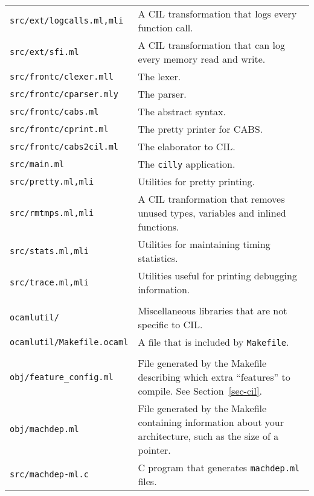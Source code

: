 \documentclass[letterpaper]{article}
\def\secref#1{Section~\ref{sec-#1}}
\def\t#1{{\tt #1}}
\begin{document}
\begin{longtable}{lp{4in}}
\t{src/ext/logcalls.ml,mli}     & A CIL transformation that logs every
                                   function call. \\
\t{src/ext/sfi.ml}              & A CIL transformation that can log every
                                   memory read and write. \\
\t{src/frontc/clexer.mll}       & The lexer. \\
\t{src/frontc/cparser.mly}      & The parser. \\
\t{src/frontc/cabs.ml}          & The abstract syntax. \\
\t{src/frontc/cprint.ml}        & The pretty printer for CABS. \\
\t{src/frontc/cabs2cil.ml}      & The elaborator to CIL. \\
\t{src/main.ml}                 & The \t{cilly} application. \\
\t{src/pretty.ml,mli}           & Utilities for pretty printing. \\
\t{src/rmtmps.ml,mli}           & A CIL tranformation that removes unused
                                  types, variables and inlined functions. \\
\t{src/stats.ml,mli}            & Utilities for maintaining timing statistics.
\\
\t{src/trace.ml,mli}            & Utilities useful for printing debugging
                                   information.\\
\\
\t{ocamlutil/}                  & Miscellaneous libraries that are not
                                  specific to CIL. \\
\t{ocamlutil/Makefile.ocaml}    & A file that is included by \t{Makefile}. \\
\\
\t{obj/feature\_config.ml}  & File generated by the Makefile
                                      describing which extra ``features''
                                      to compile. See \secref{cil}. \\
\t{obj/machdep.ml}     & File generated by the Makefile containing
                                  information about your architecture,
                                  such as the size of a pointer. \\
\t{src/machdep-ml.c}            & C program that generates
                                  \t{machdep.ml} files. \\
\end{longtable}
\end{document}
